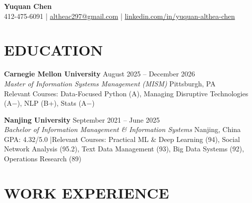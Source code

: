 \documentclass[letterpaper,11pt]{article}
\begin{document}
\begin{center}
  {\fontsize{18}{20}\selectfont\bfseries\sffamily Yuquan Chen}\\[1pt]
  \small
  412-475-6091 \;|\;
  \href{mailto:altheac297@gmail.com}{altheac297@gmail.com} \;|\;
  \href{https://www.linkedin.com/in/yuquan-althea-chen/}{linkedin.com/in/yuquan-althea-chen}
\end{center}

\section{EDUCATION}

{\textbf{Carnegie Mellon University} \hfill August 2025 -- December 2026}\\[-2pt]
{\textit{Master of Information Systems Management (MISM)} \hfill Pittsburgh, PA}\\[1pt]
{\small Relevant Courses: Data-Focused Python (A), Managing Disruptive Technologies (A$-$), NLP (B+), Stats (A$-$)}\par

\vspace{1pt}

{\textbf{Nanjing University} \hfill September 2021 -- June 2025}\\[-2pt]
{\textit{Bachelor of Information Management \& Information Systems} \hfill Nanjing, China}\\[1pt]
{\small GPA: 4.32/5.0 \quad|\quad Relevant Courses: Practical ML \& Deep Learning (94), Social Network Analysis (95.2), Text Data Management (93), Big Data Systems (92), Operations Research (89)}\par

\section{WORK EXPERIENCE}
\end{document}
